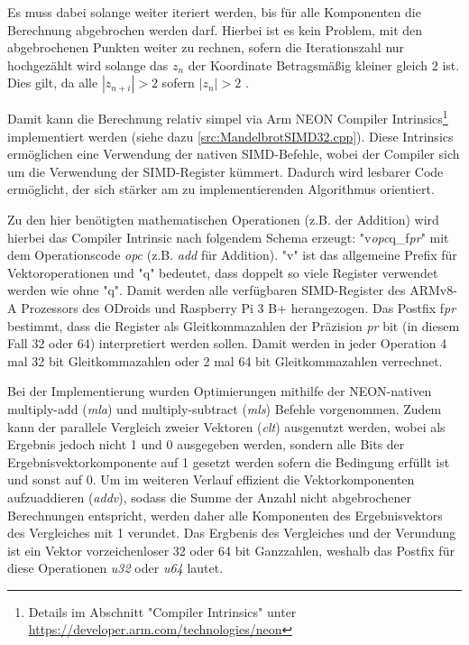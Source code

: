 Es muss dabei solange weiter iteriert werden, bis für alle Komponenten die Berechnung abgebrochen werden darf.
Hierbei ist es kein Problem, mit den abgebrochenen Punkten weiter zu rechnen, sofern die 
Iterationszahl nur hochgezählt wird solange das $z_n$ der Koordinate Betragsmäßig kleiner gleich $2$ ist.
Dies gilt, da alle $|z_{n+i}| > 2$ sofern $|z_n| > 2$ \cite{424331}.

\begin{figure}
    
\end{figure}

Damit kann die Berechnung relativ simpel via Arm NEON Compiler Intrinsics\footnote{Details im Abschnitt "Compiler Intrinsics" unter \url{https://developer.arm.com/technologies/neon}} implementiert werden (siehe dazu \autoref{src:MandelbrotSIMD32.cpp}).
Diese Intrinsics ermöglichen eine Verwendung der nativen SIMD-Befehle, wobei der Compiler sich um die Verwendung der SIMD-Register kümmert.
Dadurch wird lesbarer Code ermöglicht, der sich stärker am zu implementierenden Algorithmus orientiert.

Zu den hier benötigten mathematischen Operationen (z.B. der Addition) wird hierbei das Compiler Intrinsic nach folgendem Schema erzeugt:
"v\textit{opc}q\_f\textit{pr}" mit dem Operationscode \textit{opc} (z.B. \textit{add} für Addition).
"v" ist das allgemeine Prefix für Vektoroperationen und "q" bedeutet, dass doppelt so viele Register verwendet werden wie ohne "q".
Damit werden alle verfügbaren SIMD-Register des ARMv8-A Prozessors des ODroids und Raspberry Pi 3 B+ herangezogen.
Das Postfix f\textit{pr} bestimmt, dass die Register als Gleitkommazahlen der Präzision \textit{pr} bit (in diesem Fall 32 oder 64) interpretiert werden sollen.
Damit werden in jeder Operation 4 mal 32 bit Gleitkommazahlen oder 2 mal 64 bit Gleitkommazahlen verrechnet.

Bei der Implementierung wurden Optimierungen mithilfe der NEON-nativen multiply-add (\textit{mla}) und multiply-subtract (\textit{mls}) Befehle vorgenommen.
Zudem kann der parallele Vergleich zweier Vektoren (\textit{clt}) ausgenutzt werden, wobei als Ergebnis jedoch nicht 1 und 0 ausgegeben werden,
sondern alle Bits der Ergebnisvektorkomponente auf 1 gesetzt werden sofern die Bedingung erfüllt ist und sonst auf 0.
Um im weiteren Verlauf effizient die Vektorkomponenten aufzuaddieren (\textit{addv}), sodass die Summe der Anzahl nicht abgebrochener Berechnungen entspricht,
werden daher alle Komponenten des Ergebnisvektors des Vergleiches mit 1 verundet.
Das Ergbenis des Vergleiches und der Verundung ist ein Vektor vorzeichenloser 32 oder 64 bit Ganzzahlen, weshalb das
Postfix für diese Operationen \textit{u32} oder \textit{u64} lautet.

\begin{figure}
    
\end{figure}